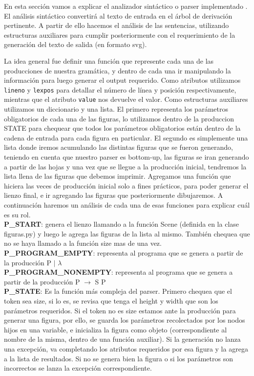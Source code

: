 En esta sección vamos a explicar el analizador sintáctico o parser implementado . El análisis sintáctico convertirá al texto de entrada
en el árbol de derivación pertinente. A partir de ello hacemos el análisis de las sentencias, utilizando estructuras auxiliares para
cumplir posteriormente con el requerimiento de la generación del texto de salida (en formato svg).

La idea general fue definir una función que represente cada una de las producciones de nuestra gramática, y dentro de cada una ir manipulando la
información para luego generar el output requerido.
Como atributos utilizamos \texttt{lineno} y \texttt{lexpos} para detallar el número de línea y posición respectivamente, mientras que el atributo \texttt{value} nos devuelve el valor.
Como estructuras auxiliares utilizamos un diccionario y una lista. El primero representa los parámetros obligatorios de cada una de las
figuras, lo utilizamos dentro de la produccion STATE para chequear que todos los parámetros obligatorios están dentro de la cadena de entrada
para cada figura en particular. El segundo es simplemente una lista donde iremos acumulando las distintas figuras que se fueron generando, teniendo
en cuenta que nuestro parser es bottom-up, las figuras se iran generando a partir de las hojas y una vez que se llegue a la producción inicial, tendremos
la lista llena de las figuras que debemos imprimir.
Agregamos una función que hiciera las veces de producción inicial solo a fines prácticos, para poder generar el lienzo final, e ir
agregando las figuras que posteriormente dibujaremos.
A continuación haremos un análisis de cada una de esas funciones para explicar cuál es su rol.\\

\textbf{P_START}: genera el lienzo llamando a la función Scene (definida en la clase figuras.py) y luego le agrega las figuras de la lista al mismo.
También chequea que no se haya llamado a la función size mas de una vez.\\

\textbf{P_PROGRAM_EMPTY}: representa al programa que se genera a partir de la producción P $\mid$ $\lambda$\\

\textbf{P_PROGRAM_NONEMPTY}: representa al programa que se genera a partir de la producción P $\rightarrow$ S P\\

\textbf{P_STATE}: Es la función más compleja del parser. Primero chequea que el token sea size, si lo es, se revisa que tenga el height y width que son los parámetros requeridos.
Si el token no es size estamos ante la producción para generar una figura, por ello, se guarda los parámetros recolectados por los nodos hijos en una variable,
 e inicializa la figura como objeto (correspondiente al nombre de la misma, dentro de una función auxiliar).
Si la generación no lanza una excepción, va completando los atributos requeridos por esa figura y la agrega a la lista de resultados. Si no se genera bien la figura o si
los parámetros son incorrectos se lanza la excepción correspondiente.\\

